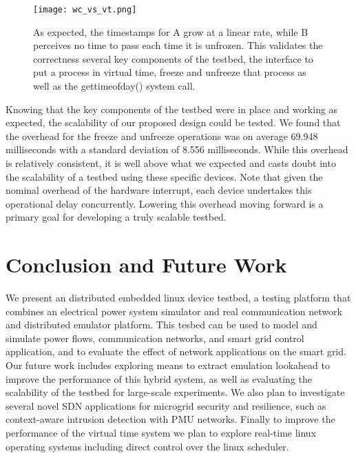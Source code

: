 \begin{figure}[H]
  \texttt{[image: wc\_vs\_vt.png]}
  \label{sim-err}

  \caption{As expected, the timestamps for A grow at a linear rate, while B perceives no time to pass each time it is unfrozen. This validates the correctness several key components of the testbed, the interface to put a process in virtual time, freeze and unfreeze that process as well as the gettimeofday() system call.
    }
\end{figure}

Knowing that the key components of the testbed were in place and working as expected, the scalability of our proposed design could be tested. We found that the overhead for the freeze and unfreeze operations was on average 69.948 milliseconds with a standard deviation of 8.556 milliseconds. While this overhead is relatively consistent, it is well above what we expected and casts doubt into the scalability of a testbed using these specific devices. Note that given the nominal overhead of the hardware interrupt, each device undertakes this operational delay concurrently. Lowering this overhead moving forward is a primary goal for developing a truly scalable testbed.

\section{Conclusion and Future Work}
We present an distributed embedded linux device testbed, a testing platform that combines an
electrical power system simulator and real communication network and distributed emulator platform. This tesbed can be used to model and simulate power flows, communication networks, and smart grid control application, and to evaluate the effect of network applications on the smart grid. Our future work includes
exploring means to extract emulation lookahead to improve
the performance of this hybrid system, as well as evaluating the scalability of the testbed for large-scale experiments. We also plan to investigate several novel SDN
applications for microgrid security and resilience, such as context-aware intrusion detection with PMU networks. Finally to improve the performance of the virtual time system we plan to explore real-time linux operating systems including direct control over the linux scheduler.
